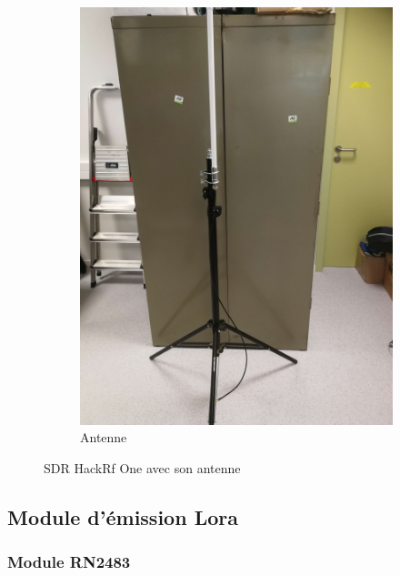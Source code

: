 \begin{figure}[h]
\begin{subfigure}{0.4\textwidth}
  \centering
  \includegraphics[width=\textwidth]{images/pied.png}
  \caption{Antenne}
  \label{term340}
\end{subfigure}
\caption{SDR HackRf One avec son antenne}
\label{bothimages}
\end{figure}


\newpage

\subsection{Module d'émission Lora}

\subsubsection{Module RN2483}

